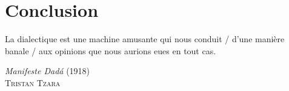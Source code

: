 \chapter{Conclusion}
\epigraph{La dialectique est une machine amusante qui nous conduit /
  d'une manière banale / aux opinions que nous aurions eues en tout
  cas.}{\emph{Manifeste Dadá} (1918)\\\textsc{Tristan Tzara}}

